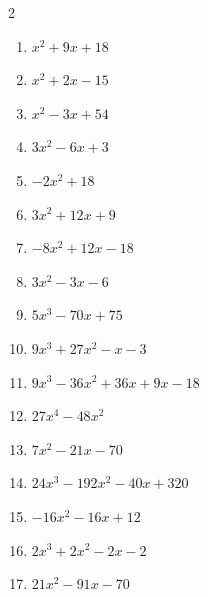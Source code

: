 \documentclass[a4paper, 12pt, parskip=half-]{scrartcl}
\begin{document}
\begin{exercise}
\begin{multicols}{2}
\begin{enumerate}
        \item $x^{2}+9x+18$
        \item $x^{2}+2x-15$
        \item $x^{2}-3x+54$
        \item $3x^{2}-6x+3$
        \item $-2x^{2}+18$
        \item $3x^{2}+12x+9$
        \item $-8x^{2}+12x-18$
        \item $3x^{2}-3x-6$
        \item $5x^{3}-70x+75$
        \item $9x^{3}+27x^{2}-x-3$
        \item $9x^{3}-36x^{2}+36x+9x-18$
        \item $27x^{4}-48x^{2}$
        \item $7x^{2}-21x-70$
        \item $24x^{3}-192x^{2}-40x+320$
        \item $-16x^{2}-16x+12$
        \item $2x^{3}+2x^{2}-2x-2$
        \item $21x^{2}-91x-70$
    \end{enumerate}
\end{multicols}
\end{exercise}
\end{document}
